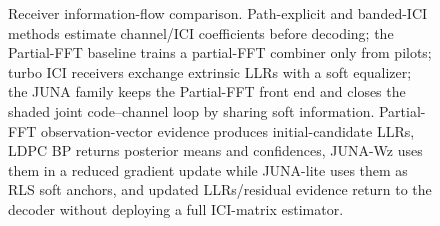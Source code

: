 \documentclass[journal]{IEEEtran}
\newcommand{\juna}{JUNA}
\newcommand{\junalite}{JUNA-lite}
\newcommand{\junawz}{JUNA-Wz}
\begin{document}
\begin{figure}[t]
{%
}
\caption{Receiver information-flow comparison. Path-explicit and banded-ICI
methods estimate channel/ICI coefficients before decoding; the Partial-FFT
baseline trains a partial-FFT combiner only from pilots; turbo ICI receivers exchange
extrinsic LLRs with a soft equalizer; the \juna{} family keeps the Partial-FFT
front end and closes the shaded joint code--channel loop by sharing soft
information. Partial-FFT observation-vector evidence produces initial-candidate LLRs, LDPC BP returns
posterior means and confidences, \junawz{} uses them in a reduced gradient update
while \junalite{} uses them as RLS soft anchors, and updated LLRs/residual
evidence return to the decoder without deploying a full ICI-matrix estimator.}
\label{fig:method-comparison}
\end{figure}

\end{document}
